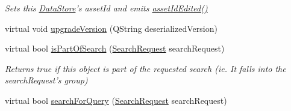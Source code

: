 \begin{DoxyCompactItemize}
\begin{DoxyCompactList}\small\item\em Sets this \hyperlink{class_picto_1_1_data_store}{Data\-Store}'s asset\-Id and emits \hyperlink{class_picto_1_1_asset_af9dc9a5935284306615aa5e19a5be49e}{asset\-Id\-Edited()} \end{DoxyCompactList}\item 
virtual void \hyperlink{class_picto_1_1_data_store_a760957a345502801d58030af95eaaf75}{upgrade\-Version} (Q\-String deserialized\-Version)
\item 
virtual bool \hyperlink{class_picto_1_1_data_store_a5afdea71e71a791fe1abf97b67050907}{is\-Part\-Of\-Search} (\hyperlink{struct_search_request}{Search\-Request} search\-Request)
\begin{DoxyCompactList}\small\item\em Returns true if this object is part of the requested search (ie. It falls into the search\-Request's group) \end{DoxyCompactList}\item 
\hypertarget{class_picto_1_1_data_store_a779d4a53640bb506f58b6e87645aa417}{virtual bool \hyperlink{class_picto_1_1_data_store_a779d4a53640bb506f58b6e87645aa417}{search\-For\-Query} (\hyperlink{struct_search_request}{Search\-Request} search\-Request)}\label{class_picto_1_1_data_store_a779d4a53640bb506f58b6e87645aa417}


\end{DoxyCompactItemize}
